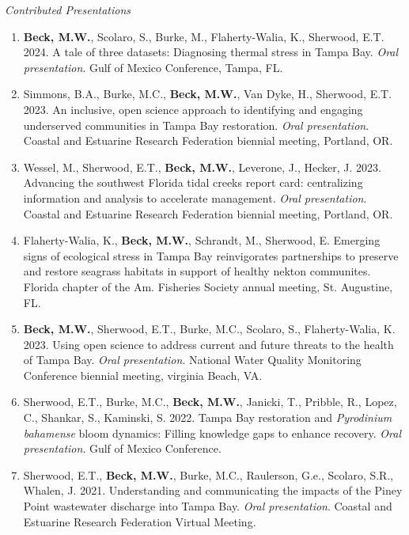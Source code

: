 \documentclass[letterpaper,12pt]{article}
\begin{document}
\vspace{\baselineskip} 
\centerline{\large{\textit{Contributed Presentations}}}

\begin{enumerate}

\item {\bf Beck, M.W.}, Scolaro, S., Burke, M., Flaherty-Walia, K., Sherwood, E.T. 2024. A tale of three datasets: Diagnosing thermal stress in Tampa Bay. \textit{Oral presentation}. Gulf of Mexico Conference, Tampa, FL.

\item Simmons, B.A., Burke, M.C., {\bf Beck, M.W.}, Van Dyke, H., Sherwood, E.T. 2023. An inclusive, open science approach to identifying and engaging underserved communities in Tampa Bay restoration. \textit{Oral presentation}. Coastal and Estuarine Research Federation biennial meeting, Portland, OR. 

\item Wessel, M., Sherwood, E.T., {\bf Beck, M.W.}, Leverone, J., Hecker, J. 2023. Advancing the southwest Florida tidal creeks report card: centralizing information and analysis to accelerate management. \textit{Oral presentation}. Coastal and Estuarine Research Federation biennial meeting, Portland, OR. 

\item Flaherty-Walia, K., {\bf Beck, M.W.}, Schrandt, M., Sherwood, E. Emerging signs of ecological stress in Tampa Bay reinvigorates partnerships to preserve and restore seagrass habitats in support of healthy nekton communites. Florida chapter of the Am. Fisheries Society annual meeting, St. Augustine, FL.

\item {\bf Beck, M.W.}, Sherwood, E.T., Burke, M.C., Scolaro, S., Flaherty-Walia, K. 2023. Using open science to address current and future threats to the health of Tampa Bay. \textit{Oral presentation}. National Water Quality Monitoring Conference biennial meeting, virginia Beach, VA.

\item Sherwood, E.T., Burke, M.C., {\bf Beck, M.W.}, Janicki, T., Pribble, R., Lopez, C., Shankar, S., Kaminski, S. 2022. Tampa Bay restoration and \textit{Pyrodinium bahamense} bloom dynamics: Filling knowledge gaps to enhance recovery. \textit{Oral presentation}. Gulf of Mexico Conference.

\item Sherwood, E.T., {\bf Beck, M.W.}, Burke, M.C., Raulerson, G.e., Scolaro, S.R., Whalen, J. 2021. Understanding and communicating the impacts of the Piney Point wastewater discharge into Tampa Bay. \textit{Oral presentation}. Coastal and Estuarine Research Federation Virtual Meeting.


\end{enumerate}
\end{document}
